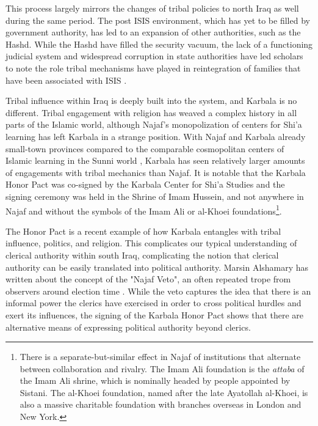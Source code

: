 This process largely mirrors the changes of tribal policies to north Iraq as well during the same period. The post ISIS environment, which has yet to be filled by government authority, has led to an expansion of other authorities, such as the Hashd. While the Hashd have filled the security vacuum, the lack of a functioning judicial system and widespread corruption in state authorities have led scholars to note the role tribal mechanisms have played in reintegration of families that have been associated with ISIS \cite{melisande_genat_state_2023}.

Tribal influence within Iraq is deeply built into the system, and Karbala is no different. Tribal engagement with religion has weaved a complex history in all parts of the Islamic world, although Najaf's monopolization of centers for Shi'a learning has left Karbala in a strange position. With Najaf and Karbala already small-town provinces compared to the comparable cosmopolitan centers of Islamic learning in the Sunni world \cite{litvak_shii_2002}, Karbala has seen relatively larger amounts of engagements with tribal mechanics than Najaf. It is notable that the Karbala Honor Pact was co-signed by the Karbala Center for Shi'a Studies and the signing ceremony was held in the Shrine of Imam Hussein, and not anywhere in Najaf and without the symbols of the Imam Ali or al-Khoei foundations\footnote{There is a separate-but-similar effect in Najaf of institutions that alternate between collaboration and rivalry. The Imam Ali foundation is the \emph{attaba} of the Imam Ali shrine, which is nominally headed by people appointed by Sistani. The al-Khoei foundation, named after the late Ayatollah al-Khoei, is also a massive charitable foundation with branches overseas in London and New York.}. 


The Honor Pact is a recent example of how Karbala entangles with tribal influence, politics, and religion. This complicates our typical understanding of clerical authority within south Iraq, complicating the notion that clerical authority can be easily translated into political authority. Marsin Alshamary has written about the concept of the "Najaf Veto", an often repeated trope from observers around election time \cite{alshamary_shia_2022}. While the veto captures the idea that there is an informal power the clerics have exercised in order to cross political hurdles and exert its influences, the signing of the Karbala Honor Pact shows that there are alternative means of expressing political authority beyond clerics. 

